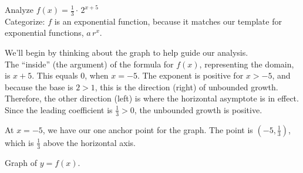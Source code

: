\documentclass{ximera}
\begin{document}
\begin{example}  



Analyze   $f(x) = \frac{1}{3} \cdot \, 2^{x+5}$ \\

Categorize: $f$ is an exponential function, because it matches our template for exponential functions, $a \, r^x$.





\begin{idea}

We'll begin by thinking about the graph to help guide our analysis. \\






The ``inside'' (the argument) of the formula for $f(x)$, representing the domain, is $x+5$.  This equals $0$, when $x=-5$.  The exponent is positive for $x>-5$, and because the base is $2 > 1$, this is the direction (right) of unbounded growth.  Therefore, the other direction (left) is where the horizontal asymptote is in effect.  Since the leading coefficient is $\frac{1}{3} > 0$, the unbounded growth is positive.

At $x=-5$, we have our one anchor point for the graph.  The point is $\left(-5, \frac{1}{3} \right)$, which is $\frac{1}{3}$ above the horizontal axis.


Graph of $y = f(x)$.

\begin{image}
\end{image}
\end{idea}
\end{example}
\end{document}
